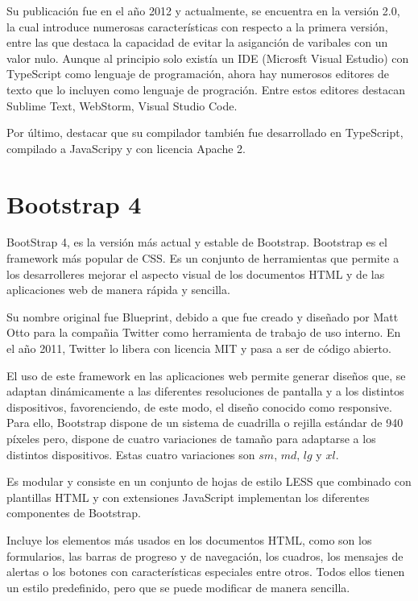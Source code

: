 \documentclass[a4paper, 12pt]{book}
\begin{document}
Su publicación fue en el año 2012 y actualmente, se encuentra en la versión 2.0, la cual introduce numerosas características con respecto a la primera versión, entre las que destaca la capacidad de evitar la asiganción de varibales con un valor nulo. Aunque al principio solo existía un IDE (Microsft Visual Estudio) con TypeScript como lenguaje de programación, ahora hay numerosos editores de texto que lo incluyen como lenguaje de progración. Entre estos editores destacan Sublime Text, WebStorm, Visual Studio Code. 

Por último, destacar que su compilador también fue desarrollado en TypeScript, compilado a JavaScripy y con licencia Apache 2. 


\section{Bootstrap 4} 
\label{sec:Bootstrap 4}

BootStrap 4,  es la versión más actual y estable de Bootstrap. Bootstrap es el framework más popular de CSS. Es un conjunto de herramientas que permite a los desarrolleres mejorar el aspecto visual de los documentos HTML y de las aplicaciones web  de manera rápida y sencilla. 

Su nombre original fue Blueprint, debido a que fue creado y diseñado por Matt Otto para la compañia Twitter como herramienta de trabajo de uso interno. En el año 2011, Twitter lo libera con licencia MIT y pasa a ser de código abierto. 

El uso de este framework en las aplicaciones web permite generar diseños que, se adaptan dinámicamente a las diferentes resoluciones de pantalla y a los distintos dispositivos, favorenciendo, de este modo, el diseño conocido como responsive. Para ello, Bootstrap dispone de un sistema de cuadrilla o rejilla estándar de 940 píxeles pero, dispone de cuatro variaciones de tamaño para adaptarse a los distintos dispositivos. Estas cuatro variaciones son $sm$, $md$, $lg$ y $xl$.

Es modular y consiste en un conjunto de hojas de estilo LESS que combinado con plantillas HTML y con extensiones JavaScript implementan los diferentes componentes de Bootstrap. 

Incluye los elementos más usados en los documentos HTML, como son los formularios, las barras de progreso y de navegación, los cuadros, los mensajes de alertas o los botones con características especiales entre otros. Todos ellos tienen un estilo predefinido, pero que se puede modificar de manera sencilla. 
\end{document}
